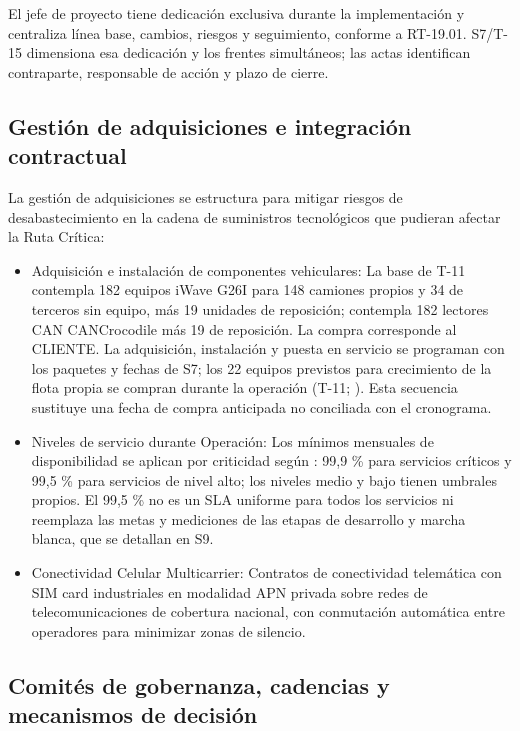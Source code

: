El jefe de proyecto tiene dedicación exclusiva durante la implementación y centraliza línea base, cambios, riesgos y seguimiento, conforme a RT-19.01. S7/T-15 dimensiona esa dedicación y los frentes simultáneos; las actas identifican contraparte, responsable de acción y plazo de cierre.

\FloatBarrier
\subsection{Gestión de adquisiciones e integración contractual}\label{sec:6-gestion-adquisiciones}\label{sec:06-gestion-de-adquisiciones-e-integracion-contractual}

La gestión de adquisiciones se estructura para mitigar riesgos de desabastecimiento en la cadena de suministros tecnológicos que pudieran afectar la Ruta Crítica:

\begin{itemize}
\item Adquisición e instalación de componentes vehiculares: La base de T-11 contempla 182 equipos iWave G26I para 148 camiones propios y 34 de terceros sin equipo, más 19 unidades de reposición; contempla 182 lectores CAN CANCrocodile más 19 de reposición. La compra corresponde al CLIENTE. La adquisición, instalación y puesta en servicio se programan con los paquetes y fechas de S7; los 22 equipos previstos para crecimiento de la flota propia se compran durante la operación (T-11; ). Esta secuencia sustituye una fecha de compra anticipada no conciliada con el cronograma.
\item Niveles de servicio durante Operación: Los mínimos mensuales de disponibilidad se aplican por criticidad según : 99,9 \% para servicios críticos y 99,5 \% para servicios de nivel alto; los niveles medio y bajo tienen umbrales propios. El 99,5 \% no es un SLA uniforme para todos los servicios ni reemplaza las metas y mediciones de las etapas de desarrollo y marcha blanca, que se detallan en S9.
\item Conectividad Celular Multicarrier: Contratos de conectividad telemática con SIM card industriales en modalidad APN privada sobre redes de telecomunicaciones de cobertura nacional, con conmutación automática entre operadores para minimizar zonas de silencio.
\end{itemize}

\FloatBarrier
\subsection{Comités de gobernanza, cadencias y mecanismos de decisión}\label{sec:6-gestion-ceremonias}\label{sec:06-comites-de-gobernanza-cadencias-y-mecanismos-de-decision}

